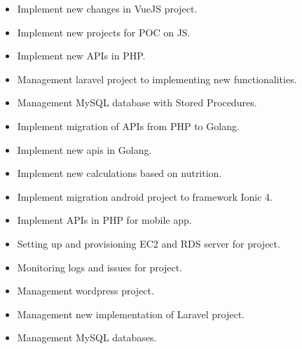 \begin{itemize}
    \item Implement new changes in VueJS project.
    \item Implement new projects for POC on JS.
    \item Implement new APIs in PHP.
    \item Management laravel project to implementing new functionalities.
    \item Management MySQL database with Stored Procedures.
    \item Implement migration of APIs from PHP to Golang.
    \item Implement new apis in Golang.
    \item Implement new calculations based on nutrition.
\end{itemize}

\divider

\begin{itemize}
    \item Implement migration android project to framework Ionic 4.
    \item Implement APIs in PHP for mobile app.
    \item Setting up and provisioning EC2 and RDS server for project.
    \item Monitoring logs and issues for project.
    \item Management wordpress project.
    \item Management new implementation of Laravel project.
    \item Management MySQL databases.
\end{itemize}
